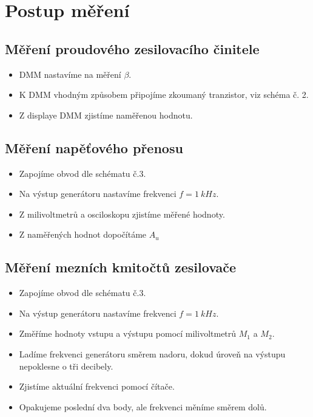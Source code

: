 \section*{Postup měření}
  \subsection*{Měření proudového zesilovacího činitele}
    \begin{itemize}
      \item
        DMM nastavíme na měření $\beta$.
      \item
      	K DMM vhodným způsobem připojíme zkoumaný tranzistor, viz schéma č. 2.
      \item
      	Z displaye DMM zjistíme naměřenou hodnotu.
		\end{itemize}
		
  \subsection*{Měření napěťového přenosu}
    \begin{itemize}
      \item
        Zapojíme obvod dle schématu č.3.
      \item
      	Na výstup generátoru nastavíme frekvenci $f = 1~kHz$.
      \item
      	Z milivoltmetrů a osciloskopu zjistíme měřené hodnoty.
      \item
      	Z naměřených hodnot dopočítáme $A_u$
		\end{itemize}
		
  \subsection*{Měření mezních kmitočtů zesilovače}
    \begin{itemize}
      \item
      	Zapojíme obvod dle schématu č.3.
      \item
      	Na výstup generátoru nastavíme frekvenci $f = 1~kHz$.
      \item
      	Změříme hodnoty vstupu a výstupu pomocí milivoltmetrů $M_1$ a $M_2$.
      \item
      	Ladíme frekvenci generátoru směrem nadoru, dokud úroveň na výstupu nepoklesne o tři decibely.
      \item
      	Zjistíme aktuální frekvenci pomocí čítače.
      \item
      	Opakujeme poslední dva body, ale frekvenci měníme směrem dolů.
		\end{itemize}
		
